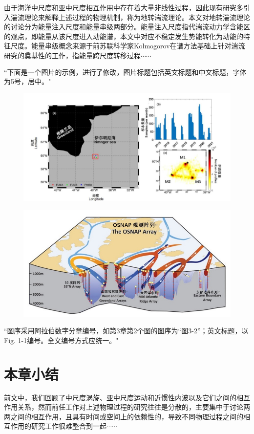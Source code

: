 由于海洋中尺度和亚中尺度相互作用中存在着大量非线性过程，因此现有研究多引入湍流理论来解释上述过程的物理机制，称为地转湍流理论。本文对地转湍流理论的讨论分为能量注入尺度和能量串级两部分。能量注入尺度指代湍流动力学含能区的观点，即能量从该尺度进入动能谱，本文中对应不稳定发生势能转化为动能的特征尺度。能量串级概念来源于前苏联科学家Kolmogorov在谱方法基础上针对湍流研究的奠基性的工作，指能量跨尺度转移过程$\cdots\cdots$

{\color{red}``下面是一个图片的示例，进行了修改，图片标题包括英文标题和中文标题，字体为5号，居中。"}

\begin{figure}[htbp]
    \centering
    \includegraphics[width=0.8\linewidth]{img/fig_1_1_study_area.jpg}
    \label{fig:enter-label}
\end{figure}

\begin{figure}[htbp]
    \centering
    \includegraphics[width=0.5\linewidth]{img/fig_1_2_OSNAP.jpg}
    \label{fig:enter-label}
\end{figure}

{\color{red}``图序采用阿拉伯数字分章编号，如第3章第2个图的图序为“图3-2”；英文标题，以Fig. 1-1编号。全文编号方式应统一。"}

\section{本章小结}

前文中，我们回顾了中尺度涡旋、亚中尺度运动和近惯性内波以及它们之间的相互作用关系，然而前任工作对上述物理过程的研究往往是分散的，主要集中于讨论两两之间的相互作用，且具有时间或空间上的依赖性的，导致不同物理过程之间的相互作用的研究工作很难整合到一起$\cdots\cdots$
